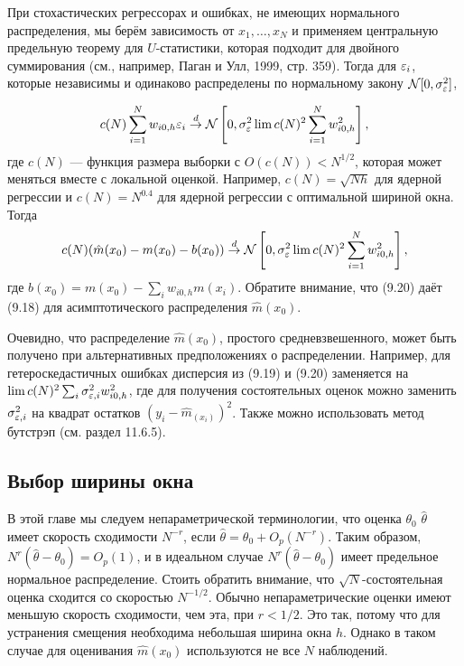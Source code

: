 При стохастических регрессорах и ошибках, не имеющих нормального распределения, мы берём зависимость от $x_1, \dots, x_N$ и применяем центральную предельную теорему для $U$-статистики, которая подходит для двойного суммирования (см., например, Паган и Улл, 1999, стр. 359). Тогда для $\varepsilon_i$, которые независимы и одинаково распределены по нормальному закону $\mathcal{N}[0, \sigma_{\varepsilon}^2]$,

\begin{equation}
c(N)\sum_{i=1}^N w_{i0,h}\varepsilon_i \stackrel{d}{\rightarrow} \mathcal{N}\left[ 0, \sigma_{\varepsilon}^2 \lim c(N)^2 \sum_{i=1}^N w_{i0,h}^2 \right],
\end{equation}
где $c(N)$ --- функция размера выборки с $O(c(N)) < N^{1/2}$, которая может меняться вместе с локальной оценкой. Например, $c(N) = \sqrt{Nh}$ для ядерной регрессии и $c(N) = N^{0.4}$ для ядерной регрессии с оптимальной шириной окна. Тогда
\begin{equation}
c(N)(\hat{m}(x_0) - m(x_0) - b(x_0)) \stackrel{d}{\rightarrow} \mathcal{N}\left[ 0, \sigma_{\varepsilon}^2 \lim c(N)^2 \sum_{i=1}^N w_{i0,h}^2 \right],
\end{equation}
где $b(x_0) = m(x_0) - \sum_i w_{i0,h} m(x_i)$. Обратите внимание, что (9.20) даёт (9.18) для асимптотического распределения $\hat{m}(x_0)$. 

Очевидно, что распределение $\hat{m}(x_0)$, простого средневзвешенного, может быть получено при альтернативных предположениях о распределении. Например, для гетероскедастичных ошибках дисперсия из (9.19) и (9.20) заменяется на $\lim c(N)^2 \sum_i \sigma_{\varepsilon,i}^2 w_{i0,h}^2$, где для получения состоятельных оценок можно заменить $\sigma_{\varepsilon,i}^2$ на квадрат остатков $(y_i - \hat{m}_(x_i))^2$. Также можно использовать метод бутстрэп (см. раздел 11.6.5).

\subsection{Выбор ширины окна}

В этой главе мы следуем непараметрической терминологии, что оценка $\theta_0$ $\hat{\theta}$ имеет скорость сходимости $N^{-r}$, если $\hat{\theta} = \theta_0 + O_p(N^{-r})$. Таким образом, $N^r (\hat{\theta} - \theta_0) = O_p(1)$, и в идеальном случае $N^r (\hat{\theta} - \theta_0)$ имеет предельное нормальное распределение. Стоить обратить внимание, что $\sqrt{N}$-состоятельная оценка сходится со скоростью $N^{-1/2}$. Обычно непараметрические оценки имеют меньшую скорость сходимости, чем эта, при $r < 1/2$. Это так, потому что для устранения смещения необходима небольшая ширина окна $h$. Однако в таком случае для оценивания $\hat{m}(x_0)$ используются не все $N$ наблюдений.

